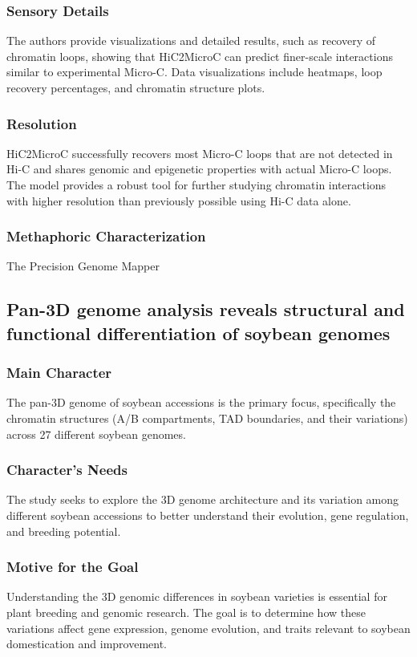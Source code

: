 \subsubsection{Sensory Details}
The authors provide visualizations and detailed results, such as recovery of chromatin loops, showing that HiC2MicroC can predict finer-scale interactions similar to experimental Micro-C. Data visualizations include heatmaps, loop recovery percentages, and chromatin structure plots.

\subsubsection{Resolution}
HiC2MicroC successfully recovers most Micro-C loops that are not detected in Hi-C and shares genomic and epigenetic properties with actual Micro-C loops. The model provides a robust tool for further studying chromatin interactions with higher resolution than previously possible using Hi-C data alone.

\subsubsection{Methaphoric Characterization}
The Precision Genome Mapper


\subsection{Pan-3D genome analysis reveals structural and functional differentiation of soybean genomes}
\subsubsection{Main Character}
The pan-3D genome of soybean accessions is the primary focus, specifically the chromatin structures (A/B compartments, TAD boundaries, and their variations) across 27 different soybean genomes.

\subsubsection{Character's Needs}
The study seeks to explore the 3D genome architecture and its variation among different soybean accessions to better understand their evolution, gene regulation, and breeding potential.

\subsubsection{Motive for the Goal}
Understanding the 3D genomic differences in soybean varieties is essential for plant breeding and genomic research. The goal is to determine how these variations affect gene expression, genome evolution, and traits relevant to soybean domestication and improvement.

